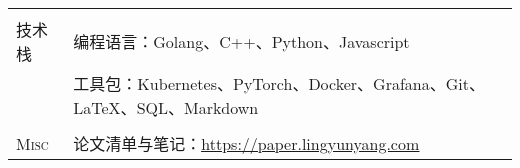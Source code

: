 \documentclass[letterpaper, 10pt]{article}
\begin{document}
\begin{longtable}{p{0.7in}p{6.0in}}
& \\

\nohyphens{技术栈}
& 编程语言：Golang、C++、Python、Javascript \\
& 工具包：Kubernetes、PyTorch、Docker、Grafana、Git、\LaTeX、SQL、Markdown \\
& \\


\nohyphens{\textsc{Misc}}
& 论文清单与笔记：\href{https://paper.lingyunyang.com}{\underline{https://paper.lingyunyang.com}} \\


\end{longtable}
\end{document}
